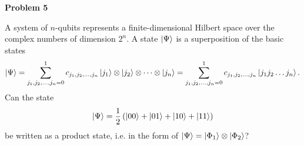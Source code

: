 \documentclass[a4paper,12pt]{article}
\newcommand{\Problem}[1]{
  {
  \vspace*{0.5cm}
  \textsf{\textbf{Problem #1}}
  \vspace*{0.2cm}
  
  }
}
\begin{document}
\Problem{5}
A system of $n$-qubits represents a finite-dimensional Hilbert space over the
complex numbers of dimension $2^n$. A state $\ket{\Psi}$ is a superposition
of the basic states
\begin{equation}
\ket{\Psi} = \sum_{j_1,j_2,\dots,j_n=0}^1 c_{j_1,j_2,\dots,j_n} \ket{j_1} \otimes \ket{j_2} \otimes \dots \otimes \ket{j_n}
           = \sum_{j_1,j_2,\dots,j_n=0}^1 c_{j_1,j_2,\dots,j_n} \ket{j_1 j_2 \dots j_n}.
\end{equation}
Can the state
\begin{equation}
\ket{\Psi} = \frac{1}{2} \left(\ket{00} + \ket{01} + \ket{10} + \ket{11}\right)
\end{equation}
be written as a product state, i.e. in the form of $\ket{\Psi} = \ket{\Phi_1} \otimes \ket{\Phi_2}$?

\end{document}
